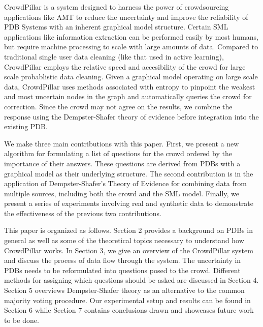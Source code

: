 CrowdPillar is a system designed to harness the power of crowdsourcing applications like AMT to reduce the uncertainty and improve the reliability of PDB Systems with an inherent graphical model structure.  Certain SML applications like information extraction can be performed easily by most humans, but require machine processing to scale with large amounts of data.  Compared to traditional single user data cleaning (like that used in active learning), CrowdPillar employs the relative speed and accesibility of the crowd for large scale probablistic data cleaning.  Given a graphical model operating on large scale data, CrowdPillar uses methods associated with entropy to pinpoint the weakest and most uncertain nodes in the graph and automatically queries the crowd for correction.  Since the crowd may not agree on the results, we combine the response using the Dempster-Shafer theory of evidence before integration into the existing PDB.

We make three main contributions with this paper.  First, we present a new algorithm for formulating a list of questions for the crowd ordered by the importance of their answers.  These questions are derived from PDBs with a graphical model as their underlying structure.  The second contribution is in the application of Dempster-Shafer's Theory of Evidence for combining data from multiple sources, including both the crowd and the SML model.  Finally, we present a series of experiments involving real and synthetic data to demonstrate the effectiveness of the previous two contributions.

This paper is organized as follows.  Section 2 provides a background on PDBs in general as well as some of the theoretical topics necessary to understand how CrowdPillar works.  In Section 3, we give an overview of the CrowdPillar system and discuss the process of data flow through the system.  The uncertainty in PDBs needs to be reformulated into questions posed to the crowd.  Different methods for assigning which questions should be asked are discussed in Section 4.  Section 5 overviews Dempster-Shafer theory as an alternative to the common majority voting procedure.  Our experimental setup and results can be found in Section 6 while Section 7 contains conclusions drawn and showcases future work to be done.
